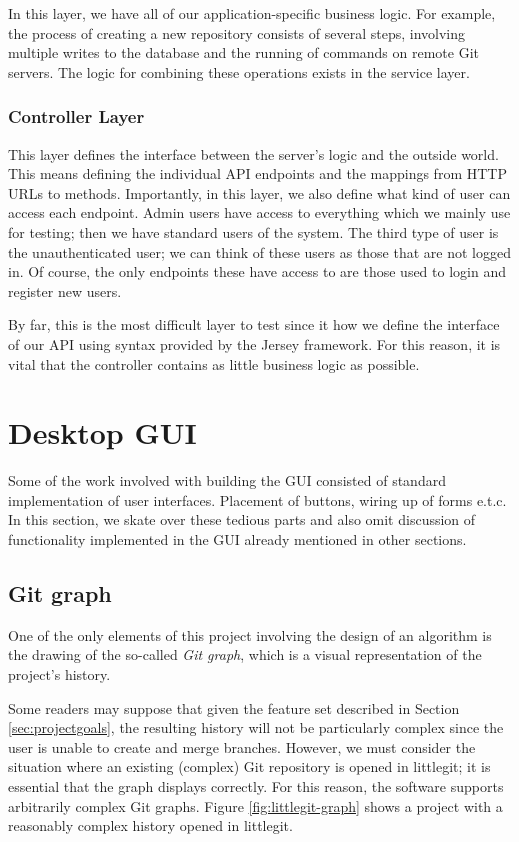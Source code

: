 In this layer, we have all of our application-specific business logic. For example, the process of creating a new repository consists of several steps, involving multiple writes to the database and the running of commands on remote Git servers. The logic for combining these operations exists in the service layer.

\subsubsection{Controller Layer}

This layer defines the interface between the server's logic and the outside world. This means defining the individual API endpoints and the mappings from HTTP URLs to methods. Importantly, in this layer, we also define what kind of user can access each endpoint. Admin users have access to everything which we mainly use for testing; then we have standard users of the system. The third type of user is the unauthenticated user; we can think of these users as those that are not logged in. Of course, the only endpoints these have access to are those used to login and register new users.

By far, this is the most difficult layer to test since it how we define the interface of our API using syntax provided by the Jersey framework. For this reason, it is vital that the controller contains as little business logic as possible.



\section{Desktop GUI}

Some of the work involved with building the GUI consisted of standard implementation of user interfaces. Placement of buttons, wiring up of forms e.t.c. In this section, we skate over these tedious parts and also omit discussion of functionality implemented in the GUI already mentioned in other sections.

\subsection{Git graph}

One of the only elements of this project involving the design of an algorithm is the drawing of the so-called \emph{Git graph}, which is a visual representation of the project's history.

Some readers may suppose that given the feature set described in Section \ref{sec:projectgoals}, the resulting history will not be particularly complex since the user is unable to create and merge branches. However, we must consider the situation where an existing (complex) Git repository is opened in littlegit; it is essential that the graph displays correctly. For this reason, the software supports arbitrarily complex Git graphs. Figure \ref{fig:littlegit-graph} shows a project with a reasonably complex history opened in littlegit.

